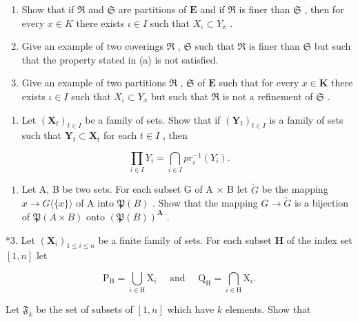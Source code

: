 \begin{enumerate}
\def\labelenumi{(\alph{enumi})}
\item
  Show that if \(\mathfrak{R}\) and \(\mathfrak{S}\) are partitions of \(\mathbf{E}\) and if \(\mathfrak{R}\) is finer than \(\mathfrak{S}\) , then for every \(x \in K\) there exists \(\iota \in I\) such that \(X_{\iota} \subset Y_{x}\) .
\item
  Give an example of two coverings \(\mathfrak{R}\) , \(\mathfrak{S}\) such that \(\mathfrak{R}\) is finer than \(\mathfrak{S}\) but such that the property stated in (a) is not satisfied.
\item
  Give an example of two partitions \(\mathfrak{R}\) , \(\mathfrak{S}\) of \(\mathbf{E}\) such that for every \(x \in \mathbf{K}\) there exists \(\iota \in I\) such that \(X_{\iota} \subset Y_{x}\) but such that \(\mathfrak{R}\) is not a refinement of \(\mathfrak{S}\) .
\end{enumerate}

\exercisegroup

\begin{enumerate}
\def\labelenumi{\arabic{enumi}.}
\tightlist
\item
  Let \((\mathbf{X}_t)_{t \in I}\) be a family of sets. Show that if \((\mathbf{Y}_t)_{t \in I}\) is a family of sets such that \(\mathbf{Y}_t \subset \mathbf{X}_t\) for each \(t \in I\) , then
\end{enumerate}

\[
\prod_ {i \in I} Y _ {i} = \bigcap_ {i \in I} p r _ {i} ^ {- 1} (Y _ {i}).
\]

\begin{enumerate}
\def\labelenumi{\arabic{enumi}.}
\setcounter{enumi}{1}
\tightlist
\item
  Let A, B be two sets. For each subset G of A × B let \(\tilde{G}\) be the mapping \(x \to G\langle\{x\}\rangle\) of A into \(\mathfrak{P}(B)\) . Show that the mapping \(G \to \tilde{G}\) is a bijection of \(\mathfrak{P}(A \times B)\) onto \((\mathfrak{P}(B))^{\mathbf{A}}\) .
\end{enumerate}

*3. Let \((\mathbf{X}_i)_{1\leqslant i\leqslant n}\) be a finite family of sets. For each subset \(\mathbf{H}\) of the index set \([1,n]\) let

\[
\mathrm{P} _ {\mathrm{H}} = \bigcup_ {i \in \mathrm{H}} \mathrm{X} _ {i} \quad \text { and } \quad \mathrm{Q} _ {\mathrm{H}} = \bigcap_ {i \in \mathrm{H}} \mathrm{X} _ {i}.
\]

Let \(\mathfrak{F}_k\) be the set of subsets of \([1, n]\) which have \(k\) elements. Show that

